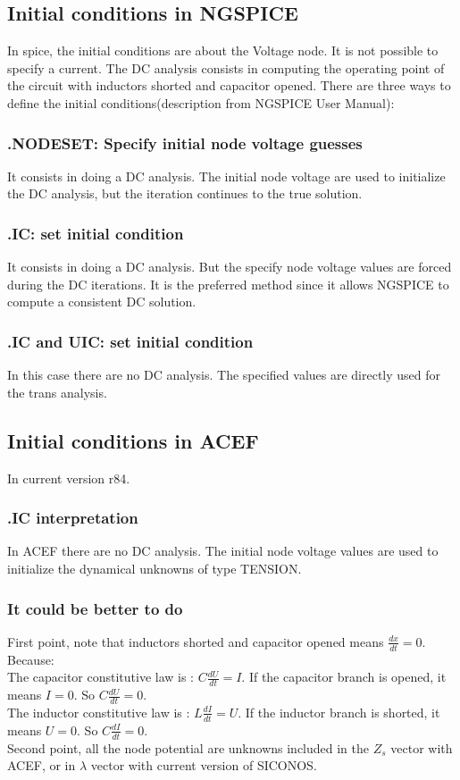 \subsection{Initial conditions in NGSPICE}
In spice, the initial conditions are about the Voltage node. It is not possible to specify a
current. The DC analysis consists in computing the operating point of the circuit with inductors
shorted and capacitor opened. There are three ways to define the initial conditions(description from NGSPICE User Manual):

\subsubsection{.NODESET: Specify initial node voltage guesses}
It consists in doing a DC analysis. The initial node voltage are used to initialize the DC analysis,
but the iteration continues to the true solution.
\subsubsection{.IC: set initial condition }
It consists in doing a DC analysis. But the specify node voltage values are forced during the DC
iterations. It is the preferred method since it allows NGSPICE to compute a consistent DC solution.
\subsubsection{.IC and UIC: set initial condition }
In this case there are no DC analysis. The specified values are directly used for the trans
analysis.

\subsection{Initial conditions in ACEF}
In current version r84.\\
\subsubsection{.IC interpretation}
In ACEF there are no DC analysis. The initial node voltage values are used to initialize the
dynamical unknowns of type TENSION.
\subsubsection{It could be better to do}
First point, note that inductors shorted and capacitor opened means $\frac{dx}{dt}=0$. Because:\\
The capacitor constitutive law is : $C\frac{dU}{dt}=I$. If the capacitor branch is opened, it means
$I=0$. So $C\frac{dU}{dt}=0$.\\
The inductor constitutive law is : $L\frac{dI}{dt}=U$. If the inductor branch is shorted, it means
$U=0$. So $C\frac{dI}{dt}=0$.\\
Second point, all the node potential are unknowns included in the $Z_{s}$ vector with ACEF, or in
$\lambda$ vector with current version of SICONOS.\\

